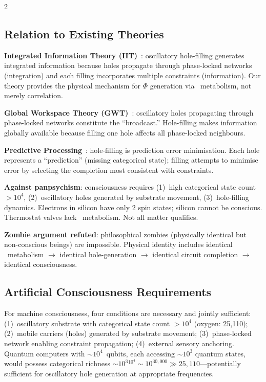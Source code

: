 \begin{multicols}{2}
\subsection{Relation to Existing Theories}
\label{ssec:existing_theories}

\textbf{Integrated Information Theory (IIT)}~\citep{tononi2016integrated}:
oscillatory hole-filling generates integrated information because holes
propagate through phase-locked networks (integration) and each filling
incorporates multiple constraints (information).  Our theory provides
the physical mechanism for $\Phi$ generation via \Otwo\ metabolism, not
merely correlation.

\textbf{Global Workspace Theory (GWT)}~\citep{baars1988cognitive}: oscillatory
holes propagating through phase-locked networks constitute the ``broadcast.''
Hole-filling makes information globally available because filling one hole
affects all phase-locked neighbours.

\textbf{Predictive Processing}~\citep{friston2010free}: hole-filling is
prediction error minimisation.  Each hole represents a ``prediction''
(missing categorical state); filling attempts to minimise error by
selecting the completion most consistent with constraints.

\textbf{Against panpsychism}: consciousness requires (1)~high categorical state
count $> 10^4$, (2)~oscillatory holes generated by substrate movement,
(3)~hole-filling dynamics.  Electrons in silicon have only 2 spin states;
silicon cannot be conscious.  Thermostat valves lack \Otwo\ metabolism.
Not all matter qualifies.

\textbf{Zombie argument refuted}: philosophical zombies (physically identical
but non-conscious beings) are impossible.  Physical identity includes
identical \Otwo\ metabolism $\to$ identical hole-generation $\to$ identical
circuit completion $\to$ identical consciousness.

\subsection{Artificial Consciousness Requirements}
\label{ssec:artificial}

For machine consciousness, four conditions are necessary and jointly sufficient:
(1)~oscillatory substrate with categorical state count $> 10^4$ (oxygen: 25,110);
(2)~mobile carriers (holes) generated by substrate movement;
(3)~phase-locked network enabling constraint propagation;
(4)~external sensory anchoring.  Quantum computers with $\sim10^4$~qubits,
each accessing $\sim10^3$ quantum states, would possess categorical richness
$\sim10^3{}^{10^4} \sim 10^{30{,}000} \gg 25{,}110$---potentially sufficient
for oscillatory hole generation at appropriate frequencies.

\end{multicols}

